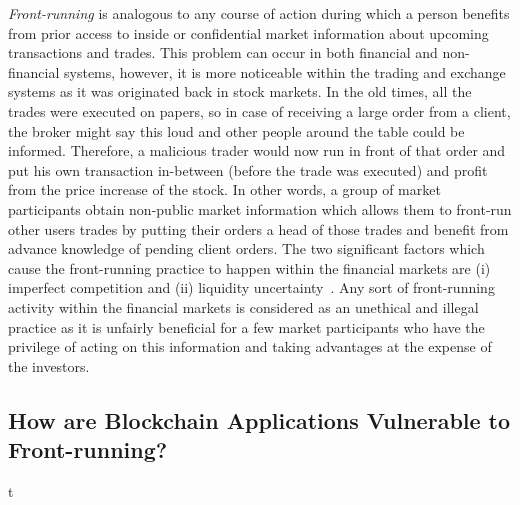\emph{Front-running} is analogous to any course of action during which a person benefits from prior access to inside or confidential market information about upcoming transactions and trades. This problem can occur in both financial and non-financial systems, however, it is more noticeable within the trading and exchange systems as it was originated back in stock markets. In the old times, all the trades were executed on papers, so in case of receiving a large order from a client, the broker might say this loud and other people around the table could be informed. Therefore, a malicious trader would now run in front of that order and put his own transaction in-between (before the trade was executed) and profit from the price increase of the stock. In other words, a group of market participants obtain non-public market information which allows them to front-run other users trades by putting their orders a head of those trades and benefit from advance knowledge of pending client orders. The two significant factors which cause the front-running practice to happen within the financial markets are (i) imperfect competition and (ii) liquidity uncertainty~\cite{liang2005distressed}. Any sort of front-running activity within the financial markets is considered as an unethical and illegal practice as it is unfairly beneficial for a few market participants who have the privilege of acting on this information and taking advantages at the expense of the investors. 



\subsection{How are Blockchain Applications Vulnerable to Front-running?} %
\label{sec:Front Running on the Blockchains}t




